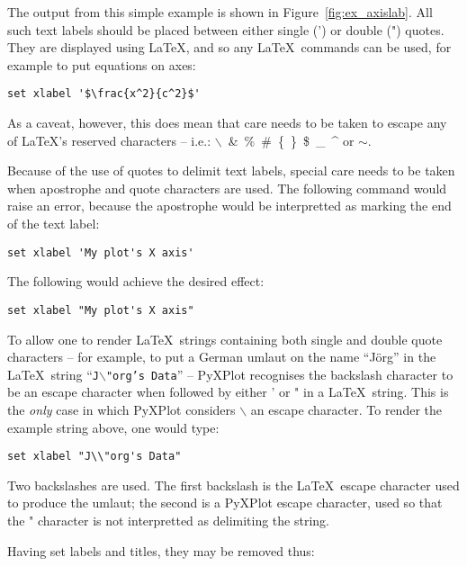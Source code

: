 \documentclass[a4paper,onecolumn,11pt]{book}
\begin{document}
\noindent The output from this simple example is shown in
Figure~\ref{fig:ex_axislab}. All such text labels should be placed between
either single (') or double (") quotes. They are displayed using \LaTeX, and so
any \LaTeX\ commands can be used, for example to put equations on axes:

\begin{verbatim}
set xlabel '$\frac{x^2}{c^2}$'
\end{verbatim}

\noindent As a caveat, however, this does mean that care needs to be taken to
escape any of \LaTeX's reserved characters -- i.e.:
$\backslash$~\&~\%~\#~\{~\}~\$~\_~\^{} or $\sim$.

Because of the use of quotes to delimit text labels, special care needs to be
taken when apostrophe and quote characters are used. The following command
would raise an error, because the apostrophe would be interpretted as marking
the end of the text label:

\begin{verbatim}
set xlabel 'My plot's X axis'
\end{verbatim}

\noindent The following would achieve the desired effect:

\begin{verbatim}
set xlabel "My plot's X axis"
\end{verbatim}

\noindent To allow one to render \LaTeX\ strings containing both single and
double quote characters -- for example, to put a German umlaut on the name
``J\"org'' in the \LaTeX\ string ``\texttt{J$\backslash$"org's Data}'' --
PyXPlot recognises the backslash character to be an escape character when
followed by either ' or " in a \LaTeX\ string. This is the \textit{only} case
in which PyXPlot considers $\backslash$ an escape character. To render the
example string above, one would type:

\begin{verbatim}
set xlabel "J\\"org's Data"
\end{verbatim}

Two backslashes are used.  The first backslash is the \LaTeX\ escape character
used to produce the umlaut; the second is a PyXPlot escape character, used so
that the " character is not interpretted as delimiting the string. 

Having set labels and titles, they may be removed thus:
\end{document}
